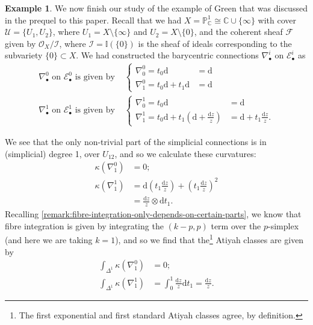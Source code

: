 \documentclass[11pt,fleqn]{article}
\theoremstyle{plain}
\theoremstyle{definition}
\newtheorem{example}[theorem]{Example}
\theoremstyle{remark}
\numberwithin{equation}{theorem}
\newcommand{\cover}{\mathcal{U}}
\newcommand{\OO}{\mathcal{O}}
\renewcommand{\d}{\mathrm{d}}
\begin{document}
        \begin{example}
            We now finish our study of the example of Green that was discussed in the prequel to this paper.
            Recall that we had $X=\mathbb{P}_\mathbb{C}^1\cong\mathbb{C}\cup\{\infty\}$ with cover $\cover=\{U_1,U_2\}$, where $U_1=X\setminus\{\infty\}$ and $U_2=X\setminus\{0\}$, and the coherent sheaf $\mathscr{F}$ given by $\OO_X/\mathscr{I}$, where $\mathscr{I}=\mathbb{I}(\{0\})$ is the sheaf of ideals corresponding to the subvariety $\{0\}\subset X$.
            We had constructed the barycentric connections $\nabla_\bullet^i$ on $\mathcal{E}_\bullet^i$ as
            \begin{align*}
                \nabla_\bullet^0\text{ on }\mathcal{E}_\bullet^0\text{ is given by }
                &\begin{cases}
                    \nabla_0^0 = t_0\d&=\d\\
                    \nabla_1^0 = t_0\d+t_1\d&=\d
                \end{cases}\\
                \nabla_\bullet^1\text{ on }\mathcal{E}_\bullet^1\text{ is given by }
                &\begin{cases}
                    \nabla_0^1 = t_0\d&=\d\\
                    \nabla_1^1 = t_0\d+t_1\left(\d+\frac{\d z}{z}\right)&=\d+t_1\frac{\d z}{z}.
                \end{cases}
            \end{align*}

            We see that the only non-trivial part of the simplicial connections is in (simplicial) degree 1, over $U_{12}$, and so we calculate these curvatures:
            \begin{align*}
                \kappa(\nabla_1^0) &= 0;\\
                \kappa(\nabla_1^1) &= \d\left(t_1\frac{\d z}{z}\right)+\left(t_1\frac{\d z}{z}\right)^2\\
                &= \frac{\d z}{z}\otimes\d t_1.
            \end{align*}
            Recalling \cref{remark:fibre-integration-only-depends-on-certain-parts}, we know that fibre integration is given by integrating the $(k-p,p)$ term over the $p$-simplex (and here we are taking $k=1$), and so we find that the\footnote{The first exponential and first standard Atiyah classes agree, by definition.} Atiyah classes are given by
            \begin{align*}
                \int_{\Delta^1}\kappa(\nabla_1^0) &= 0;\\
                \int_{\Delta^1}\kappa(\nabla_1^1) &= \int_0^1\frac{\d z}{z}\d t_1 = \frac{\d z}{z}.
            \end{align*}


\end{example}
\end{document}
